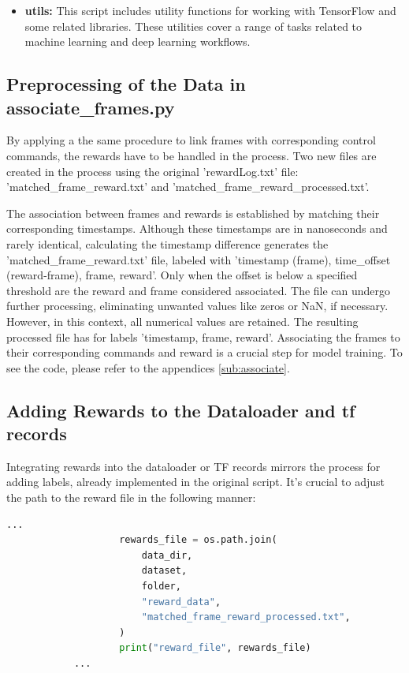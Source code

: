 \documentclass[12pt]{report}
\begin{document}
\begin{itemize}
    \item \textbf{utils:} This script includes utility functions for working with TensorFlow and some related libraries. These utilities cover a range of tasks related to machine learning and deep learning workflows. 
\end{itemize}

\subsection{Preprocessing of the Data in associate\_frames.py}
\label{sub:preprocessing}

By applying a the same procedure to link frames with corresponding control commands, the rewards have to be handled in the process. Two new files are created in the process using the original 'rewardLog.txt' file: 'matched\_frame\_reward.txt' and 'matched\_frame\_reward\_processed.txt'. 

The association between frames and rewards is established by matching their corresponding timestamps. Although these timestamps are in nanoseconds and rarely identical, calculating the timestamp difference generates the 'matched\_frame\_reward.txt' file, labeled with 'timestamp (frame), time\_offset (reward-frame), frame, reward'. Only when the offset is below a specified threshold are the reward and frame considered associated. The file can undergo further processing, eliminating unwanted values like zeros or NaN, if necessary. However, in this context, all numerical values are retained. The resulting processed file has for labels 'timestamp, frame, reward'. Associating the frames to their corresponding commands and reward is a crucial step for model training. To see the code, please refer to the appendices \ref{sub:associate}.



\subsection{Adding Rewards to the Dataloader and tf records}
\label{sub:reward}
Integrating rewards into the dataloader or TF records mirrors the process for adding labels, already implemented in the original script. It's crucial to adjust the path to the reward file in the following manner:
\begin{lstlisting}[language=Python]
            ...
                    rewards_file = os.path.join(
                        data_dir,
                        dataset,
                        folder,
                        "reward_data",
                        "matched_frame_reward_processed.txt",
                    )
                    print("reward_file", rewards_file)
            ...  
\end{lstlisting}
\end{document}
